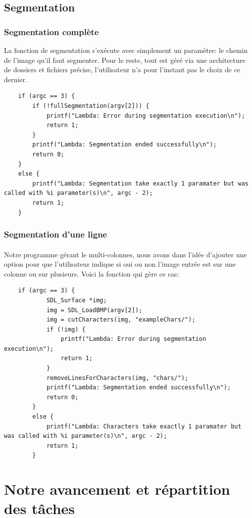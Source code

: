 \documentclass{article}
\begin{document}
\subsection{Segmentation}

\subsubsection{Segmentation complète}
La fonction de segmentation s'exécute avec simplement un paramètre: le chemin de l'image qu'il faut segmenter. Pour le reste, tout est géré via une architecture de dossiers et fichiers précise, l'utilisateur n'a pour l'instant pas le choix de ce dernier.

\begin{lstlisting}
	if (argc == 3) {
		if (!fullSegmentation(argv[2])) {
			printf("Lambda: Error during segmentation execution\n");
			return 1;
		}
		printf("Lambda: Segmentation ended successfully\n");
		return 0;
	}
	else {
		printf("Lambda: Segmentation take exactly 1 paramater but was called with %i parameter(s)\n", argc - 2);
		return 1;
	}
\end{lstlisting}

\subsubsection{Segmentation d'une ligne}

\paragraph{}Notre programme gérant le multi-colonnes, nous avons dans l'idée d'ajouter une option pour que l'utilisateur indique si oui ou non l'image entrée est sur une colonne ou sur plusieurs. Voici la fonction qui gère ce cas:

\begin{lstlisting}
	if (argc == 3) {
			SDL_Surface *img;
			img = SDL_LoadBMP(argv[2]);
			img = cutCharacters(img, "exampleChars/");
			if (!img) {
				printf("Lambda: Error during segmentation execution\n");
				return 1;
			}
			removeLinesForCharacters(img, "chars/");
			printf("Lambda: Segmentation ended successfully\n");
			return 0;
		}
		else {
			printf("Lambda: Characters take exactly 1 paramater but was called with %i parameter(s)\n", argc - 2);
			return 1;
		}
\end{lstlisting}

\newpage
{}
\section{Notre avancement et répartition des tâches}
\end{document}
